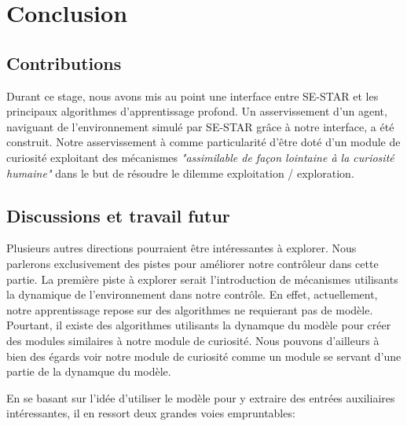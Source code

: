 \section{Conclusion}
\subsection{Contributions}

Durant ce stage, nous avons mis au point une interface entre SE-STAR et les principaux algorithmes d'apprentissage profond. Un asservissement d'un agent, naviguant de l'environnement simulé par SE-STAR grâce à notre interface, a été construit. Notre asservissement à comme particularité d'être doté d'un module de curiosité exploitant des mécanismes \emph{"assimilable de façon lointaine à la curiosité humaine"} dans le but de résoudre le dilemme exploitation / exploration.


\subsection{Discussions et travail futur}

Plusieurs autres directions pourraient être intéressantes à explorer. Nous parlerons exclusivement des pistes pour améliorer notre contrôleur dans cette partie. La première piste à explorer serait l'introduction de mécanismes utilisants la dynamique de l'environnement dans notre contrôle. En effet, actuellement, notre apprentissage repose sur des algorithmes ne requierant pas de modèle. Pourtant, il existe des algorithmes utilisants la dynamque du modèle pour créer des modules similaires à notre module de curiosité. Nous pouvons d'ailleurs à bien des égards voir notre module de curiosité comme un module se servant d'une partie de la dynamque du modèle. 

En se basant sur l'idée d'utiliser le modèle pour y extraire des entrées auxiliaires intéressantes, il en ressort deux grandes voies empruntables:

